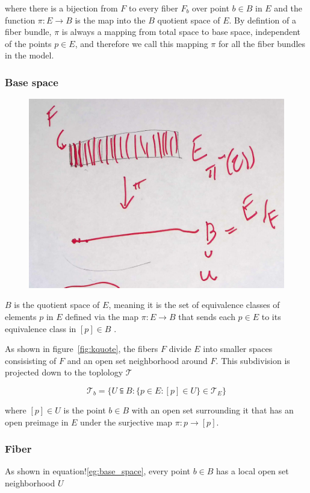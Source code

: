 \documentclass[../main.tex]{subfiles}
\begin{document}
where there is a bijection from $F$ to every fiber $F_b$ over point $b \in B$ in $E$ and the function $\pi: E \rightarrow B$ is the map into the $B$ quotient space of $E$. By defintion of a fiber bundle, $\pi$ is always a mapping from total space to base space, independent of the points $p \in E$, and therefore we call this mapping $\pi$ for all the fiber bundles in the model. 

\subsubsection{Base space}
\begin{figure}[H]
    \label{fig:base_space}
    \includegraphics[width=0.4\linewidth]{figures/sections/math/k_qspace.png}
\end{figure}

$B$ is the quotient space of $E$, meaning it is the set of equivalence classes of elements $p$ in $E$ defined via the map $\pi: E \rightarrow B$ that sends each $p \in E$ to its equivalence class in $[p] \in B$ \cite{QuotientSpaceTopology2020,QuotientSpaceTopology2020}.

As shown in figure~\ref{fig:kquote}, the fibers $F$ divide $E$ into smaller spaces consisisting of $F$ and an open set neighborhood around $F$. This subdivision is projected down to the toplology $\mathcal{T}$

\begin{equation}
    \label{eq:base_space}
\mathcal{T}_b = \{U\subseteqq B: \{p \in E: [p] \in U\}\in \mathcal{T}_E\}
\end{equation}

where $[p] \in U$ is the point $b \in B$ with an open set surrounding it that has an open preimage in $E$ under the surjective map $\pi: p \rightarrow [p]$. 

\subsubsection{Fiber}
As shown in equation!\ref{eg:base_space}, every point $b \in B$ has a local open set neighborhood $U$ \cite{FiberBundle2020, rowlandFiberBundle}
\end{document}
